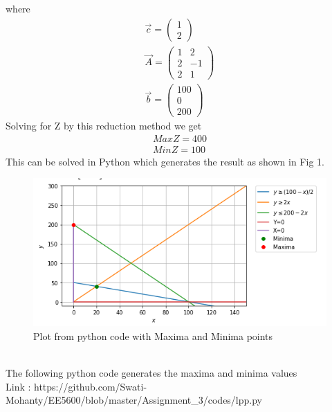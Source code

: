 \documentclass[journal,12pt,twocolumn]{IEEEtran}
\newcommand{\myvec}[1]{\ensuremath{\begin{pmatrix}#1\end{pmatrix}}}
\begin{document}
where
\begin{align}
    \Vec{c}=\myvec{1\\2}\\
    \Vec{A}=\myvec{1 & 2\\2 & -1\\2 & 1}\\
    \Vec{b}=\myvec{100\\0\\200}
\end{align}
Solving for Z by this reduction method we get
\begin{align}
    Max Z = 400 
    \\Min Z = 100
\end{align}
This can be solved in Python which generates the result as shown in Fig 1. 
\begin{figure}[h]
\renewcommand{\theenumi}{1}
\centering
\includegraphics[width=\columnwidth]{plot.png}
\caption{Plot from python code with Maxima and Minima points}
\label{Fig:1}
\end{figure}
\\The following python code generates the maxima and minima values
\\Link : https://github.com/Swati-Mohanty/EE5600/blob/master/Assignment_3/codes/lpp.py 
\end{document}
